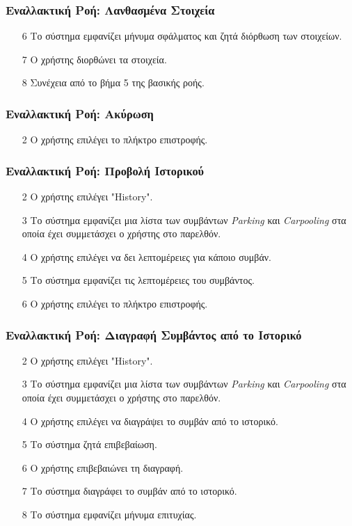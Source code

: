 \subsubsection{Εναλλακτική Ροή: Λανθασμένα Στοιχεία}

\begin{enumerate}
    \item[6] Το σύστημα εμφανίζει μήνυμα σφάλματος και ζητά διόρθωση των στοιχείων.
    \item[7] Ο χρήστης διορθώνει τα στοιχεία.
    \item[8] Συνέχεια από το βήμα 5 της βασικής ροής.
\end{enumerate}

\subsubsection{Εναλλακτική Ροή: Ακύρωση}

\begin{enumerate}
    \item[2] Ο χρήστης επιλέγει το πλήκτρο επιστροφής.
\end{enumerate}

\subsubsection{Εναλλακτική Ροή: Προβολή Ιστορικού}

\begin{enumerate}
    \item[2] Ο χρήστης επιλέγει "History".
    \item[3] Το σύστημα εμφανίζει μια λίστα των συμβάντων \textit{Parking} και
        \textit{Carpooling} στα οποία έχει συμμετάσχει ο χρήστης στο παρελθόν.
    \item[4] Ο χρήστης επιλέγει να δει λεπτομέρειες για κάποιο συμβάν.
    \item[5] Το σύστημα εμφανίζει τις λεπτομέρειες του συμβάντος.
    \item[6] Ο χρήστης επιλέγει το πλήκτρο επιστροφής.
\end{enumerate}

\subsubsection{Εναλλακτική Ροή: Διαγραφή Συμβάντος από το Ιστορικό}

\begin{enumerate}
    \item[2] Ο χρήστης επιλέγει "History".
    \item[3] Το σύστημα εμφανίζει μια λίστα των συμβάντων \textit{Parking} και
        \textit{Carpooling} στα οποία έχει συμμετάσχει ο χρήστης στο παρελθόν.
    \item[4] Ο χρήστης επιλέγει να διαγράψει το συμβάν από το ιστορικό.
    \item[5] Το σύστημα ζητά επιβεβαίωση.
    \item[6] Ο χρήστης επιβεβαιώνει τη διαγραφή.
    \item[7] Το σύστημα διαγράφει το συμβάν από το ιστορικό.
    \item[8] Το σύστημα εμφανίζει μήνυμα επιτυχίας.
\end{enumerate}

